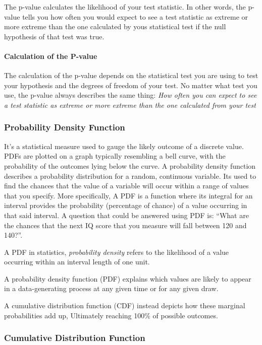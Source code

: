 \documentclass[11pt]{article}
\begin{document}
The p-value calculates the likelihood of your test statistic. In other words, 
the p-value tells you how often you would expect to see a test statistic as extreme
or more extreme than the one calculated by yous statistical test if the null hypothesis of
that test was true. 

\paragraph{Calculation of the P-value} The calculation of the p-value depends
on the statistical test you are using to test your hypothesis and the degrees of freedom
of your test. No matter what test you use, the p-value always describes the same thing: 
\emph{How often you can expect to see a test statistic as extreme or more extreme than the one calculated from your test}

\hypertarget{probability-density-function}{%
\subsubsection{Probability Density
Function}\label{probability-density-function}}

It's a statistical measure used to gauge the likely outcome of a
discrete value. PDFs are plotted on a graph typically resembling a bell
curve, with the probability of the outcomes lying below the curve. A
probability density function describes a probability distribution for a
random, continuous variable. Its used to find the chances that the value
of a variable will occur within a range of values that you specify. More
specifically, A PDF is a function where its integral for an interval
provides the probability (percentage of chance) of a value occurring in
that said interval. A question that could be answered using PDF is:
``What are the chances that the next IQ score that you measure will fall
between 120 and 140?''.

A PDF in statistics, \emph{probability density} refers to the likelihood
of a value occurring within an interval length of one unit.

A probability density function (PDF) explains which values are likely to
appear in a data-generating process at any given time or for any given
draw.

A cumulative distribution function (CDF) instead depicts how these
marginal probabilities add up, Ultimately reaching 100\% of possible
outcomes.

\hypertarget{cumulative-distribution-function}{%
\subsubsection{Cumulative Distribution
Function}\label{cumulative-distribution-function}}
\end{document}
